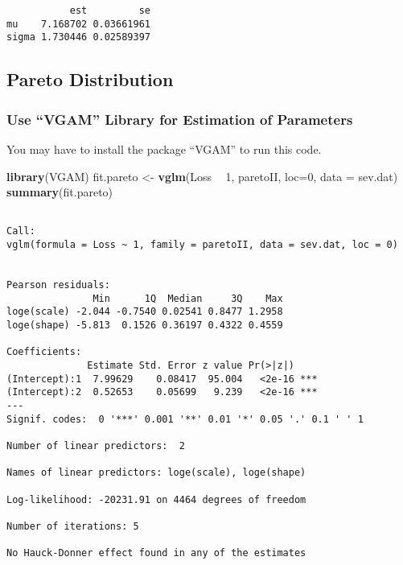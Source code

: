 \documentclass[]{book}
\newenvironment{Shaded}{\begin{snugshade}}{\end{snugshade}}
\newcommand{\KeywordTok}[1]{\textcolor[rgb]{0.13,0.29,0.53}{\textbf{#1}}}
\newcommand{\DataTypeTok}[1]{\textcolor[rgb]{0.13,0.29,0.53}{#1}}
\newcommand{\DecValTok}[1]{\textcolor[rgb]{0.00,0.00,0.81}{#1}}
\newcommand{\StringTok}[1]{\textcolor[rgb]{0.31,0.60,0.02}{#1}}
\newcommand{\OperatorTok}[1]{\textcolor[rgb]{0.81,0.36,0.00}{\textbf{#1}}}
\newcommand{\NormalTok}[1]{#1}
\theoremstyle{definition}
\theoremstyle{definition}
\theoremstyle{definition}
\theoremstyle{remark}
\begin{document}
\begin{verbatim}
           est         se
mu    7.168702 0.03661961
sigma 1.730446 0.02589397
\end{verbatim}

\subsection{Pareto Distribution}\label{pareto-distribution-1}

\subsubsection{\texorpdfstring{Use ``VGAM'' Library for Estimation of
Parameters}{Use VGAM Library for Estimation of Parameters}}\label{use-vgam-library-for-estimation-of-parameters-1}

You may have to install the package ``VGAM'' to run this code.

\begin{Shaded}
\begin{Highlighting}[]
\KeywordTok{library}\NormalTok{(VGAM)}
\NormalTok{fit.pareto <-}\StringTok{ }\KeywordTok{vglm}\NormalTok{(Loss }\OperatorTok{~}\StringTok{ }\DecValTok{1}\NormalTok{, paretoII, }\DataTypeTok{loc=}\DecValTok{0}\NormalTok{, }\DataTypeTok{data =}\NormalTok{ sev.dat)}
\KeywordTok{summary}\NormalTok{(fit.pareto)}
\end{Highlighting}
\end{Shaded}

\begin{verbatim}

Call:
vglm(formula = Loss ~ 1, family = paretoII, data = sev.dat, loc = 0)


Pearson residuals:
               Min      1Q  Median     3Q    Max
loge(scale) -2.044 -0.7540 0.02541 0.8477 1.2958
loge(shape) -5.813  0.1526 0.36197 0.4322 0.4559

Coefficients: 
              Estimate Std. Error z value Pr(>|z|)    
(Intercept):1  7.99629    0.08417  95.004   <2e-16 ***
(Intercept):2  0.52653    0.05699   9.239   <2e-16 ***
---
Signif. codes:  0 '***' 0.001 '**' 0.01 '*' 0.05 '.' 0.1 ' ' 1

Number of linear predictors:  2 

Names of linear predictors: loge(scale), loge(shape)

Log-likelihood: -20231.91 on 4464 degrees of freedom

Number of iterations: 5 

No Hauck-Donner effect found in any of the estimates
\end{verbatim}
\end{document}
